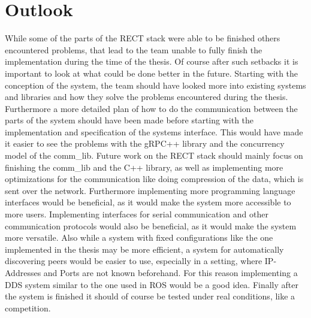 \section{Outlook}
While some of the parts of the RECT stack were able to be finished others encountered problems, that lead to the team unable to fully finish the implementation during the time of the thesis.
Of course after such setbacks it is important to look at what could be done better in the future. Starting with the conception of the system, the team should have looked more into existing
systems and libraries and how they solve the problems encountered during the thesis. Furthermore a more detailed plan of how to do the communication between the parts of the system should have been made
before starting with the implementation and specification of the systems interface. This would have made it easier to see the problems with the gRPC++ library and the concurrency model of the comm_lib.
Future work on the RECT stack should mainly focus on finishing the comm_lib and the C++ library, as well as implementing more optimizations for the communication like doing compression of the data, which is sent over the network.
Furthermore implementing more programming language interfaces would be beneficial, as it would make the system more accessible to more users. Implementing interfaces for serial communication and other communication protocols would
also be beneficial, as it would make the system more versatile. Also while a system with fixed configurations like the one implemented in the thesis may be more efficient, a system for automatically discovering peers would be easier
to use, especially in a setting, where IP-Addresses and Ports are not known beforehand. For this reason implementing a DDS system similar to the one used in ROS would be a good idea. Finally after the system is finished it should
of course be tested under real conditions, like a competition.

\filbreak